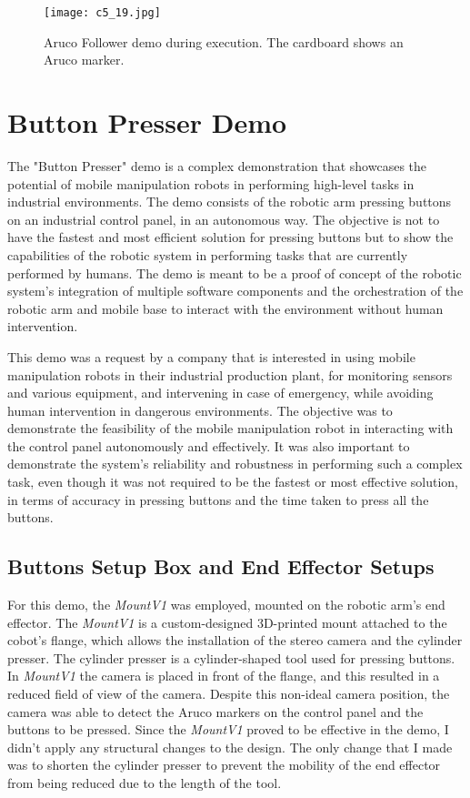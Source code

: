 \begin{figure}[t]
    \centering
    \texttt{[image: c5\_19.jpg]}
    \caption{Aruco Follower demo during execution. The cardboard shows an Aruco marker.}
    \label{fig:arucofollower}
\end{figure}

\section{Button Presser Demo}

The "Button Presser" demo is a complex demonstration that showcases the potential of mobile manipulation robots
in performing high-level tasks in industrial environments. The demo consists of the robotic arm pressing buttons
on an industrial control panel, in an autonomous way. The objective is not to have the fastest and most 
efficient solution for pressing buttons but to show the capabilities of the robotic system in performing
tasks that are currently performed by humans. The demo is meant to be a proof of concept of the robotic system's
integration of multiple software components and the orchestration of the robotic arm and mobile base to
interact with the environment without human intervention.

This demo was a request by a company that is interested in using mobile manipulation robots in their
industrial production plant, for monitoring sensors and various equipment, and intervening in case of emergency,
while avoiding human intervention in dangerous environments. The objective was to demonstrate the feasibility
of the mobile manipulation robot in interacting with the control panel autonomously and effectively. 
It was also important to demonstrate the system's reliability and robustness in performing such a complex task,
even though it was not required to be the fastest or most effective solution, in terms of accuracy in pressing
buttons and the time taken to press all the buttons.

\subsection{Buttons Setup Box and End Effector Setups}

For this demo, the \textit{MountV1} was employed, mounted on the robotic arm's end effector. The \textit{MountV1} is a 
custom-designed 3D-printed mount attached to the cobot's flange, which allows the installation of the stereo camera and 
the cylinder presser. The cylinder presser is a cylinder-shaped tool used for pressing buttons.
In \textit{MountV1} the camera is placed in front of the flange, and this resulted in a reduced field of view of the camera.
Despite this non-ideal camera position, the camera was able to detect the Aruco markers on the control panel
and the buttons to be pressed. Since the \textit{MountV1} proved to be effective in the demo, I didn't apply any
structural changes to the design. The only change that I made was to shorten the cylinder presser to prevent
the mobility of the end effector from being reduced due to the length of the tool.

